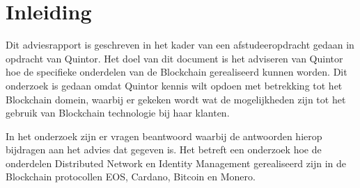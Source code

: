 \newpage
\chapter{Inleiding}

Dit adviesrapport is geschreven in het kader van een afstudeeropdracht gedaan in opdracht van Quintor. Het doel van dit document is het adviseren van Quintor hoe de specifieke onderdelen van de Blockchain gerealiseerd kunnen worden. Dit onderzoek is gedaan omdat Quintor kennis wilt opdoen met betrekking tot het Blockchain domein, waarbij er gekeken wordt wat de mogelijkheden zijn tot het gebruik van Blockchain technologie bij haar klanten.

In het onderzoek zijn er vragen beantwoord waarbij de antwoorden hierop bijdragen aan het advies dat gegeven is. Het betreft een onderzoek hoe de onderdelen Distributed Network en Identity Management gerealiseerd zijn in de Blockchain protocollen EOS, Cardano, Bitcoin en Monero.
